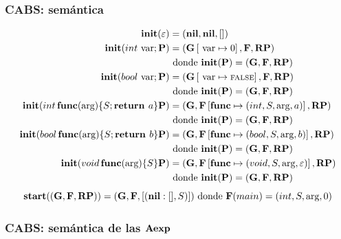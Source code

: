 \documentclass[spanish, a4paper, 12pt, final, slideColor, nototal, colorBG, pdf, noaccumulate, darkblue] {beamer}
\begin{document}
\begin{frame}
  \frametitle{CABS: semántica}
  \fontsize{10}{7.2}\selectfont
  \begin{align*}
  \init(\varepsilon) &= (\nil, \nil, [])\\
  \init(int \var \; \P) &= (\G\ass{\var}{0}, \F, \RP) \\ &\text{ donde } \init(\P) = (\G, \F, \RP)\\
  \init(bool \var \; \P) &= (\G\ass{\var}{\False}, \F, \RP) \\ &\text{ donde } \init(\P) = (\G, \F, \RP)\\
  \init(int \, \func(\args) \{ S\; \return a\} \P) &= (\G, \F\ass{\func}{(int, S, \args, a)}, \RP) \\ &\text{ donde } \init(\P) = (\G, \F, \RP)\\
  \init(bool \, \func(\args) \{ S\; \return b\} \P) &= (\G, \F\ass{\func}{(bool, S, \args, b)}, \RP) \\ &\text{ donde } \init(\P) = (\G, \F, \RP)\\
  \init(void \, \func(\args) \{ S\} \P) &= (\G, \F\ass{\func}{(void, S, \args, \varepsilon)}, \RP) \\ &\text{ donde } \init(\P) = (\G, \F, \RP)\\
  \end{align*}
  $$
  \start((\G, \F, \RP)) = (\G, \F, [(\nil:[], S)]) \text{ donde } \F(main) = (int, S, \args, 0)
  $$
\end{frame}

\begin{frame}[fragile]
  \frametitle{CABS: semántica de las $\AExp$}
  \fontsize{10}{7.2}\selectfont
  \begin{prooftree*}
\end{prooftree*}

\begin{prooftree*}
\end{prooftree*}

\begin{prooftree*}
\end{prooftree*}
\end{frame}
\end{document}
